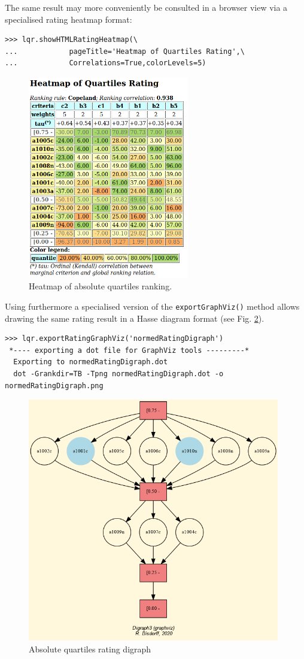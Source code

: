 The same result may more conveniently be consulted in a browser view via a specialised rating heatmap format: 
\begin{lstlisting}
>>> lqr.showHTMLRatingHeatmap(\
...            pageTitle='Heatmap of Quartiles Rating',\
...            Correlations=True,colorLevels=5)
\end{lstlisting}
\begin{figure}[h]
\sidecaption[t]
 \includegraphics[width=7cm]{Figures/heatMap1.png}
\caption{Heatmap of absolute quartiles ranking.}
\label{fig:10.2}       %
\end{figure}
	    
Using furthermore a specialised version of the \texttt{exportGraphViz()} method allows drawing the same rating result in a Hasse diagram format (see Fig. \ref{fig:10.3}).
\begin{lstlisting}
>>> lqr.exportRatingGraphViz('normedRatingDigraph')
 *---- exporting a dot file for GraphViz tools ---------*
  Exporting to normedRatingDigraph.dot
  dot -Grankdir=TB -Tpng normedRatingDigraph.dot -o normedRatingDigraph.png
\end{lstlisting}
\begin{figure}[h]
  \includegraphics[width=11cm]{Figures/normedRatingDigraph.png}
\caption{Absolute quartiles rating digraph}
\label{fig:10.3}       %
\end{figure}

